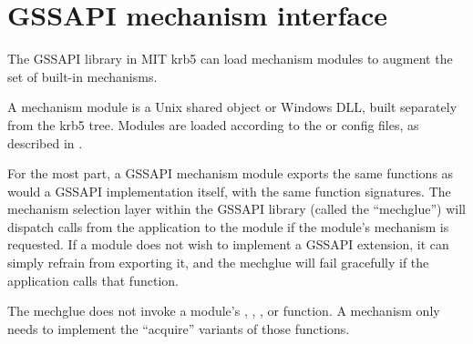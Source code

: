 \documentclass[letterpaper,10pt,english]{sphinxmanual}
\begin{document}
\begin{sphinxVerbatim}[commandchars=\\\{\}]
     
                     

     
                     
      
      
      
     
\end{sphinxVerbatim}


\section{GSSAPI mechanism interface}
\label{\detokenize{plugindev/gssapi::doc}}\label{\detokenize{plugindev/gssapi:gssapi-mechanism-interface}}
The GSSAPI library in MIT krb5 can load mechanism modules to augment
the set of built-in mechanisms.

A mechanism module is a Unix shared object or Windows DLL, built
separately from the krb5 tree.  Modules are loaded according to the
 or  config files, as
described in .

For the most part, a GSSAPI mechanism module exports the same
functions as would a GSSAPI implementation itself, with the same
function signatures.  The mechanism selection layer within the GSSAPI
library (called the “mechglue”) will dispatch calls from the
application to the module if the module’s mechanism is requested.  If
a module does not wish to implement a GSSAPI extension, it can simply
refrain from exporting it, and the mechglue will fail gracefully if
the application calls that function.

The mechglue does not invoke a module’s ,
, , or
 function.  A mechanism only needs to
implement the “acquire” variants of those functions.
\end{document}
